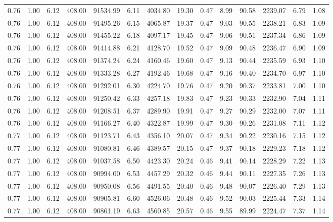 \begin{table}[!ht]
\begin{tabular}{rrrrrrrrrrrrrr}
0.76 & 1.00 & 6.12 & 408.00 & 91534.99 & 6.11 & 4034.80 & 19.30 & 0.47 & 8.99 & 90.58 & 2239.07 & 6.79 & 1.08 \\
0.76 & 1.00 & 6.12 & 408.00 & 91495.26 & 6.15 & 4065.87 & 19.37 & 0.47 & 9.03 & 90.55 & 2238.21 & 6.83 & 1.09 \\
0.76 & 1.00 & 6.12 & 408.00 & 91455.22 & 6.18 & 4097.17 & 19.45 & 0.47 & 9.06 & 90.51 & 2237.34 & 6.86 & 1.09 \\
0.76 & 1.00 & 6.12 & 408.00 & 91414.88 & 6.21 & 4128.70 & 19.52 & 0.47 & 9.09 & 90.48 & 2236.47 & 6.90 & 1.09 \\
0.76 & 1.00 & 6.12 & 408.00 & 91374.24 & 6.24 & 4160.46 & 19.60 & 0.47 & 9.13 & 90.44 & 2235.59 & 6.93 & 1.10 \\
0.76 & 1.00 & 6.12 & 408.00 & 91333.28 & 6.27 & 4192.46 & 19.68 & 0.47 & 9.16 & 90.40 & 2234.70 & 6.97 & 1.10 \\
0.76 & 1.00 & 6.12 & 408.00 & 91292.01 & 6.30 & 4224.70 & 19.76 & 0.47 & 9.20 & 90.37 & 2233.81 & 7.00 & 1.10 \\
0.76 & 1.00 & 6.12 & 408.00 & 91250.42 & 6.33 & 4257.18 & 19.83 & 0.47 & 9.23 & 90.33 & 2232.90 & 7.04 & 1.11 \\
0.76 & 1.00 & 6.12 & 408.00 & 91208.51 & 6.37 & 4289.90 & 19.91 & 0.47 & 9.27 & 90.29 & 2232.00 & 7.07 & 1.11 \\
0.76 & 1.00 & 6.12 & 408.00 & 91166.27 & 6.40 & 4322.87 & 19.99 & 0.47 & 9.30 & 90.26 & 2231.08 & 7.11 & 1.12 \\
0.77 & 1.00 & 6.12 & 408.00 & 91123.71 & 6.43 & 4356.10 & 20.07 & 0.47 & 9.34 & 90.22 & 2230.16 & 7.15 & 1.12 \\
0.77 & 1.00 & 6.12 & 408.00 & 91080.81 & 6.46 & 4389.57 & 20.15 & 0.47 & 9.37 & 90.18 & 2229.23 & 7.18 & 1.12 \\
0.77 & 1.00 & 6.12 & 408.00 & 91037.58 & 6.50 & 4423.30 & 20.24 & 0.46 & 9.41 & 90.14 & 2228.29 & 7.22 & 1.13 \\
0.77 & 1.00 & 6.12 & 408.00 & 90994.00 & 6.53 & 4457.29 & 20.32 & 0.46 & 9.44 & 90.11 & 2227.35 & 7.26 & 1.13 \\
0.77 & 1.00 & 6.12 & 408.00 & 90950.08 & 6.56 & 4491.55 & 20.40 & 0.46 & 9.48 & 90.07 & 2226.40 & 7.29 & 1.13 \\
0.77 & 1.00 & 6.12 & 408.00 & 90905.81 & 6.60 & 4526.06 & 20.48 & 0.46 & 9.52 & 90.03 & 2225.44 & 7.33 & 1.14 \\
0.77 & 1.00 & 6.12 & 408.00 & 90861.19 & 6.63 & 4560.85 & 20.57 & 0.46 & 9.55 & 89.99 & 2224.47 & 7.37 & 1.14 \\

\end{tabular}
\end{table}
